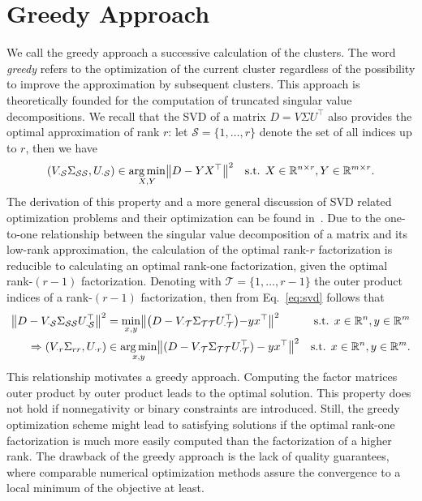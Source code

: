 \section{Greedy Approach}\label{sec:ZS:GreedyApproach}
We call the greedy approach a successive calculation of the clusters. The word \emph{greedy} refers to the optimization of the current cluster regardless of the possibility to improve the approximation by subsequent clusters. This approach is theoretically founded for the computation of truncated singular value decompositions. 
We recall that the SVD of a matrix $D=V\Sigma U^\top$ also provides the optimal approximation of rank $r$: let $\mathcal{S}=\{1,\ldots,r\}$ denote the set of all indices up to $r$, then we have
\begin{align}
     (V_{\cdot \mathcal{S}}\Sigma_{\mathcal{S}\mathcal{S}},U_{\cdot\mathcal{S}})&\in\operatorname*{arg\,min}_{X,Y}\bigl\lVert D-YX^\top\bigr\rVert ^2 &\text{s.t. } X\in\mathbb{R}^{n\times r}, Y\in\mathbb{R}^{m\times r}.\label{eq:svd}
\end{align}
The derivation of this property and a more general discussion of SVD related optimization problems and their optimization can be found in~\citep{udell2016generalized}.
Due to the one-to-one relationship between the singular value decomposition of a matrix and its low-rank approximation, the calculation of the optimal rank-$r$ factorization is reducible to calculating an optimal rank-one factorization, given the optimal rank-$(r-1)$ factorization. Denoting with $\mathcal{T}=\{1,\ldots,r-1\}$ the outer product indices of a rank-$(r-1)$ factorization, then from Eq.~\eqref{eq:svd} follows that  
\begin{align*}
\bigl\lVert D-V_{\cdot \mathcal{S}}\Sigma_{\mathcal{S}\mathcal{S}}U_{\cdot\mathcal{S}}^\top\bigr\rVert ^2
     &= \min_{x,y} \bigl\lVert \bigr(D-V_{\cdot \mathcal{T}}\Sigma_{\mathcal{T}\mathcal{T}}U_{\cdot\mathcal{T}}^\top\bigl)-yx^\top\bigr\rVert ^2 &\text{s.t. } x\in\mathbb{R}^{n}, y\in\mathbb{R}^{m}\\
\Rightarrow(V_{\cdot r}\Sigma_{rr},U_{\cdot r})
     &\in \operatorname*{arg\,min}_{x,y} \bigl\lVert (D-V_{\cdot \mathcal{T}}\Sigma_{\mathcal{T}\mathcal{T}}U_{\cdot\mathcal{T}}^\top)-yx^\top\bigr\rVert ^2 &\text{s.t. } x\in\mathbb{R}^{n}, y\in\mathbb{R}^{m}.
\end{align*}
This relationship motivates a greedy approach. Computing the factor matrices outer product by outer product leads to the optimal solution. This property does not hold if nonnegativity or binary constraints are introduced. Still, the greedy optimization scheme might lead to satisfying solutions if the optimal rank-one factorization is much more easily computed than the factorization of a higher rank. The drawback of the greedy approach is the lack of quality guarantees, where comparable numerical optimization methods assure the convergence to a local minimum of the objective at least.
